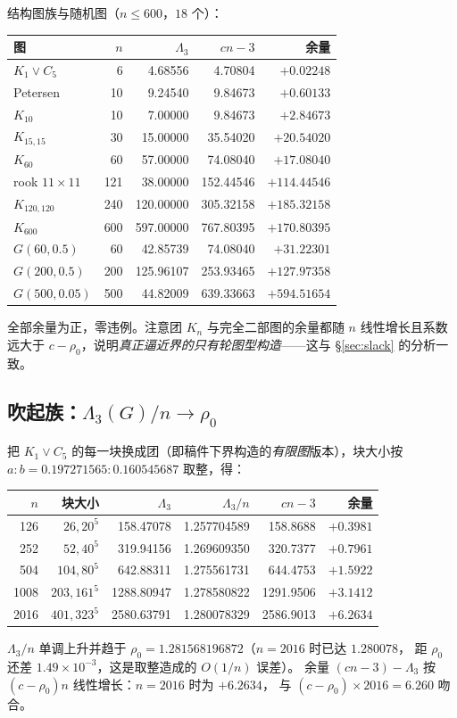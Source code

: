 \documentclass[UTF8,11pt]{ctexart}
\theoremstyle{definition}
\begin{document}
结构图族与随机图（$n\le600$，$18$ 个）：
\begin{center}
\small
\begin{tabular}{lrrrr}
\toprule
图 & $n$ & $\Lambda_3$ & $cn-3$ & 余量\\
\midrule
$K_1\vee C_5$ & 6 & 4.68556 & 4.70804 & $+0.02248$\\
Petersen & 10 & 9.24540 & 9.84673 & $+0.60133$\\
$K_{10}$ & 10 & 7.00000 & 9.84673 & $+2.84673$\\
$K_{15,15}$ & 30 & 15.00000 & 35.54020 & $+20.54020$\\
$K_{60}$ & 60 & 57.00000 & 74.08040 & $+17.08040$\\
rook $11\times11$ & 121 & 38.00000 & 152.44546 & $+114.44546$\\
$K_{120,120}$ & 240 & 120.00000 & 305.32158 & $+185.32158$\\
$K_{600}$ & 600 & 597.00000 & 767.80395 & $+170.80395$\\
$G(60,0.5)$ & 60 & 42.85739 & 74.08040 & $+31.22301$\\
$G(200,0.5)$ & 200 & 125.96107 & 253.93465 & $+127.97358$\\
$G(500,0.05)$ & 500 & 44.82009 & 639.33663 & $+594.51654$\\
\bottomrule
\end{tabular}
\end{center}
\noindent 全部余量为正，零违例。注意团 $K_n$ 与完全二部图的余量都随 $n$ 线性增长且系数远大于
$c-\rho_0$，说明\emph{真正逼近界的只有轮图型构造}——这与 \S\ref{sec:slack} 的分析一致。

\subsection{吹起族：$\Lambda_3(G)/n\to\rho_0$}

把 $K_1\vee C_5$ 的每一块换成团（即稿件下界构造的\emph{有限图}版本），块大小按
$a:b=0.197271565:0.160545687$ 取整，得：
\begin{center}
\small
\begin{tabular}{rrrrrr}
\toprule
$n$ & 块大小 & $\Lambda_3$ & $\Lambda_3/n$ & $cn-3$ & 余量\\
\midrule
126  & $26,20^5$   & 158.47078  & 1.257704589 & 158.8688  & $+0.3981$\\
252  & $52,40^5$   & 319.94156  & 1.269609350 & 320.7377  & $+0.7961$\\
504  & $104,80^5$  & 642.88311  & 1.275561731 & 644.4753  & $+1.5922$\\
1008 & $203,161^5$ & 1288.80947 & 1.278580822 & 1291.9506 & $+3.1412$\\
2016 & $401,323^5$ & 2580.63791 & 1.280078329 & 2586.9013 & $+6.2634$\\
\bottomrule
\end{tabular}
\end{center}
\noindent $\Lambda_3/n$ 单调上升并趋于 $\rho_0=1.281568196872$（$n=2016$ 时已达 $1.280078$，
距 $\rho_0$ 还差 $1.49\times10^{-3}$，这是取整造成的 $O(1/n)$ 误差）。
余量 $(cn-3)-\Lambda_3$ 按 $(c-\rho_0)n$ 线性增长：$n=2016$ 时为 $+6.2634$，
与 $(c-\rho_0)\times2016=6.260$ 吻合。
\end{document}
